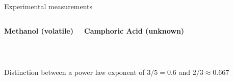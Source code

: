 \documentclass[compress,10pt,dvipsnames,svgnames,pdftex]{beamer}
\begin{document}
\begin{frame}{Experimental measurements}

{\scriptsize
\begin{columns}
\column{6cm}
\begin{mdframed}[style=MyFrame]
\centerline{\bf Methanol (volatile)}
\centerline{}
\end{mdframed}

\column{6cm}
\begin{mdframed}[style=MyFrame]
\centerline{\bf Camphoric Acid (unknown)}
\centerline{}
\end{mdframed}
\end{columns}
}
~\\[5mm]
\centerline{Distinction between a power law exponent of $3/5 = 0.6$ and $2/3 \approx 0.667$}
\end{frame}
\end{document}
